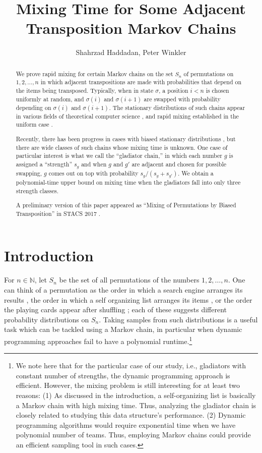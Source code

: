 \documentclass[10 pt]{article}
\date{}
\title{Mixing Time for Some Adjacent Transposition Markov Chains}
\author{Shahrzad Haddadan, Peter Winkler}
\newcommand{\N}{{\mathbb{N}}}
\begin{document}
\maketitle

\begin{abstract}

We prove rapid mixing for certain Markov chains on the set $S_n$ of permutations on $1,2,\dots,n$ in which adjacent transpositions
are made with probabilities that depend on the items being transposed.  Typically, when in state $\sigma$, a position $i<n$ is chosen
uniformly at random, and $\sigma(i)$ and $\sigma(i{+}1)$ are swapped with probability depending on $\sigma(i)$ and $\sigma(i{+}1)$.
The stationary distributions of such chains appear in various fields of theoretical computer science \cite{Wilson, Self1, Mallow},
and rapid mixing established in the uniform case \cite{Wilson}.

Recently, there has been progress in cases with biased stationary distributions \cite{Benjamini, Dana}, but there are wide classes of
such chains whose mixing time is unknown.  One case of particular interest is what we call the ``gladiator chain,'' in which each number $g$
is assigned a ``strength'' $s_g$ and when $g$ and $g'$ are adjacent and chosen for possible swapping, $g$ comes out on top with probability
$s_g/(s_g + s_{g'})$.   We obtain a polynomial-time upper bound on mixing time when the gladiators fall into only three strength classes.

A preliminary version of this paper appeared as ``Mixing of Permutations by Biased Transposition'' in STACS 2017 \cite{Stacs}.
 \end{abstract}

\section{Introduction}\label{intro}
For $n\in \N$, let $S_n$ be the set of all permutations of the numbers $1,2,\dots ,n$.  One can think of a permutation as the order
in which a search engine arranges its results \cite{Mallow}, the order in which a self organizing list arranges its items \cite{Self1,Self2},
or the order the playing cards appear after shuffling \cite{Wilson, Diaconis}; each of these suggests different probability distributions on $S_n$.
Taking samples from such distributions is a useful task which can be tackled using a Markov chain, in particular when dynamic programming approaches
fail to have a polynomial runtime.\footnote{We note here that for the particular case of our study, i.e., gladiators with constant number of
strengths, the dynamic programming approach is efficient. However, the mixing problem is still interesting for at least two reasons:
(1) As discussed in the introduction, a self-organizing list is basically a Markov chain with high mixing time. Thus, analyzing the gladiator
chain is closely related to studying this data structure's performance.  (2) Dynamic programming algorithms would require exponential
time when we have polynomial number of teams. Thus, employing Markov chains could provide an efficient sampling tool in such cases.} 
\end{document}
